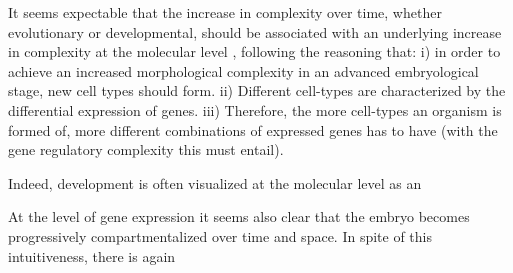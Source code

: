 It seems expectable that the increase in complexity over time, whether evolutionary or developmental, should be associated with an underlying increase in complexity at the molecular level \citep{Arthur2010}, following the reasoning that:
i) in order to achieve an increased morphological complexity in an advanced embryological stage, new cell types should form.
ii) Different cell-types are characterized by the differential expression of genes.
iii) Therefore, the more cell-types an organism is formed of, more different combinations of expressed genes has to have (with the gene regulatory complexity this must entail).

Indeed, development is often visualized at the molecular level as an 



At the level of gene expression it seems also clear that the embryo becomes progressively compartmentalized over time and space. In spite of this intuitiveness, there is again
